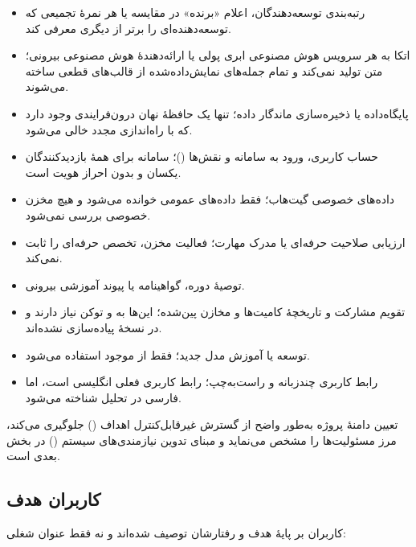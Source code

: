 \documentclass[12pt]{article}
\begin{document}
 \begin{itemize}
\item رتبه‌بندی توسعه‌دهندگان، اعلام «برنده» در مقایسه یا هر نمرهٔ تجمیعی که توسعه‌دهنده‌ای را برتر از دیگری معرفی کند.
\item اتکا به هر سرویس هوش مصنوعی ابری پولی یا ارائه‌دهندهٔ هوش مصنوعی بیرونی؛  متن تولید نمی‌کند و تمام جمله‌های نمایش‌داده‌شده از قالب‌های قطعی ساخته می‌شوند.
\item پایگاه‌داده یا ذخیره‌سازی ماندگار داده؛ تنها یک حافظهٔ نهان درون‌فرایندی وجود دارد که با راه‌اندازی مجدد خالی می‌شود.
\item حساب کاربری، ورود به سامانه و نقش‌ها ()؛ سامانه برای همهٔ بازدیدکنندگان یکسان و بدون احراز هویت است.
\item داده‌های خصوصی گیت‌هاب؛ فقط داده‌های عمومی خوانده می‌شود و هیچ مخزن خصوصی بررسی نمی‌شود.
\item ارزیابی صلاحیت حرفه‌ای یا مدرک مهارت؛ فعالیت مخزن، تخصص حرفه‌ای را ثابت نمی‌کند.
\item توصیهٔ دوره، گواهینامه یا پیوند آموزشی بیرونی.
\item تقویم مشارکت و تاریخچهٔ کامیت‌ها و مخازن پین‌شده؛ این‌ها به  و توکن نیاز دارند و در نسخهٔ  پیاده‌سازی نشده‌اند.
\item توسعه یا آموزش مدل جدید؛ فقط از  موجود استفاده می‌شود.
\item رابط کاربری چندزبانه و راست‌به‌چپ؛ رابط کاربری فعلی انگلیسی است، اما  فارسی در تحلیل شناخته می‌شود.
\end{itemize}
 تعیین دامنهٔ پروژه به‌طور واضح از گسترش غیرقابل‌کنترل اهداف () جلوگیری می‌کند، مرز مسئولیت‌ها را مشخص می‌نماید و مبنای تدوین نیازمندی‌های سیستم () در بخش بعدی است.
\subsection{کاربران هدف}
 کاربران بر پایهٔ هدف و رفتارشان توصیف شده‌اند و نه فقط عنوان شغلی:
\end{document}
